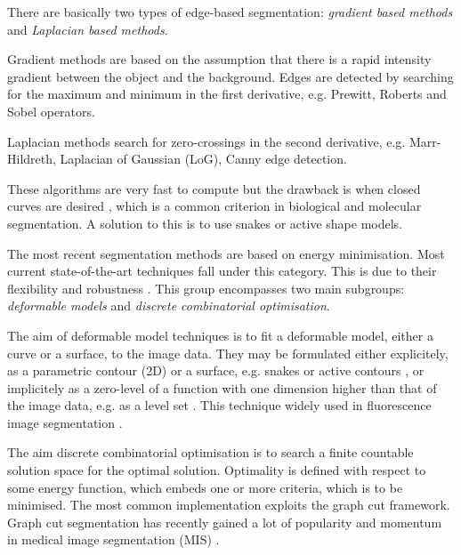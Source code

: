 \begin{definition}
	There are basically two types of edge-based segmentation: \textit{gradient based methods} and \textit{Laplacian based methods}.
	
	Gradient methods are based on the assumption that there is a rapid intensity gradient between the object and the background.
	Edges are detected by searching for the maximum and minimum in the first derivative, e.g. Prewitt, Roberts and Sobel operators.
	
	Laplacian methods search for zero-crossings in the second derivative, e.g. Marr-Hildreth, Laplacian of Gaussian (LoG), Canny edge detection.
	
	These algorithms are very fast to compute but the drawback is when closed curves are desired \citep{Bengtsson2004}, which is a common criterion in biological and molecular segmentation.
	A solution to this is to use snakes or active shape models.
\end{definition}

\begin{definition}
	The most recent segmentation methods are based on energy minimisation.
	Most current state-of-the-art techniques fall under this category.
	This is due to their flexibility and robustness \citep{Danek2012}.
	This group encompasses two main subgroups: \textit{deformable models} and \textit{discrete combinatorial optimisation}.
	
	The aim of deformable model techniques is to fit a deformable model, either a curve or a surface, to the image data.
	They may be formulated either explicitely, as a parametric contour (2D) or a surface, e.g. snakes \citep{Kass1988} or active contours \citep{Caselles1997,Li2009,Cheng2009}, or implicitely as a zero-level of a function with one dimension higher than that of the image data, e.g. as a level set \citep{Osher2003}.
	This technique widely used in fluorescence image segmentation \citep{Dzyubachyk2008,Ortiz2001,Dufour2005,Dzyubachyk2010,Boukari2014,Maska2007}.
	
	The aim discrete combinatorial optimisation is to search a finite countable solution space for the optimal solution.
	Optimality is defined with respect to some energy function, which embeds one or more criteria, which is to be minimised.
	The most common implementation exploits the graph cut framework.
	Graph cut segmentation has recently gained a lot of popularity and momentum in medical image segmentation (MIS) \citep{Danek2009,Chen2008,Kofahi2010,Kong2011,Yang2009,Zhang2014,Liu2008,Vu2008}.
\end{definition}

